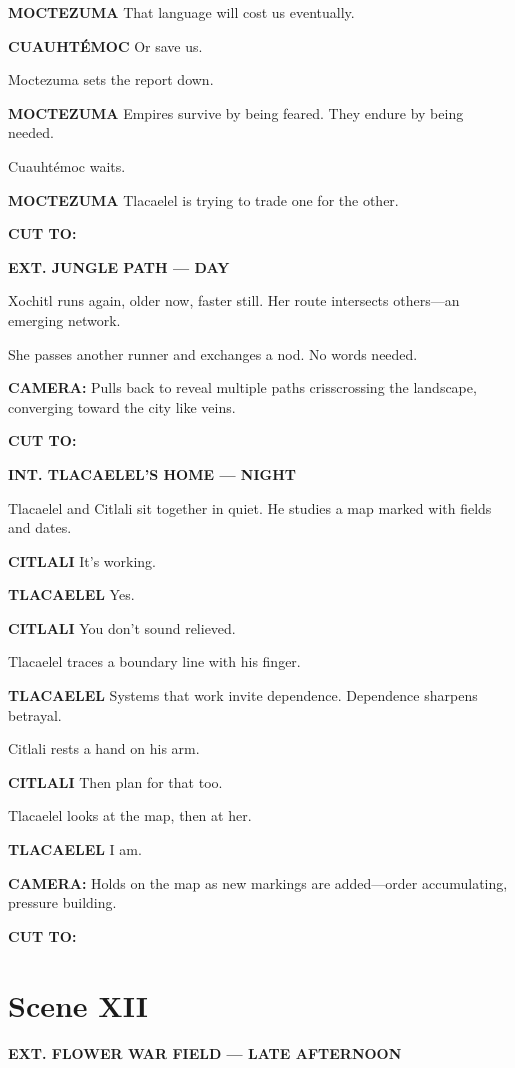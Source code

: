 \documentclass[12pt]{article}
\begin{document}
\textbf{MOCTEZUMA}  
That language will cost us eventually.

\textbf{CUAUHTÉMOC}  
Or save us.

Moctezuma sets the report down.

\textbf{MOCTEZUMA}  
Empires survive by being feared.  
They endure by being needed.

Cuauhtémoc waits.

\textbf{MOCTEZUMA}  
Tlacaelel is trying to trade one for the other.

\textbf{CUT TO:}

\textbf{EXT. JUNGLE PATH — DAY}

Xochitl runs again, older now, faster still. Her route intersects others—an emerging network.

She passes another runner and exchanges a nod. No words needed.

\textbf{CAMERA:} Pulls back to reveal multiple paths crisscrossing the landscape, converging toward the city like veins.

\textbf{CUT TO:}

\textbf{INT. TLACAELEL’S HOME — NIGHT}

Tlacaelel and Citlali sit together in quiet. He studies a map marked with fields and dates.

\textbf{CITLALI}  
It’s working.

\textbf{TLACAELEL}  
Yes.

\textbf{CITLALI}  
You don’t sound relieved.

Tlacaelel traces a boundary line with his finger.

\textbf{TLACAELEL}  
Systems that work invite dependence.  
Dependence sharpens betrayal.

Citlali rests a hand on his arm.

\textbf{CITLALI}  
Then plan for that too.

Tlacaelel looks at the map, then at her.

\textbf{TLACAELEL}  
I am.

\textbf{CAMERA:} Holds on the map as new markings are added—order accumulating, pressure building.

\textbf{CUT TO:}

\section*{Scene XII}

\textbf{EXT. FLOWER WAR FIELD — LATE AFTERNOON}
\end{document}
